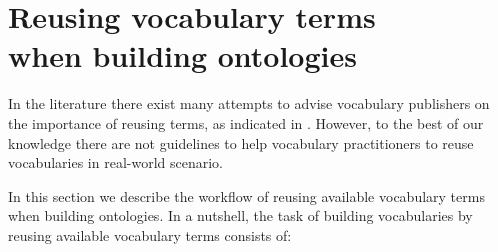

\section{Reusing vocabulary terms\\ when building ontologies}\label{sec:reuse}

In the literature there exist many attempts to advise vocabulary publishers on the importance of reusing terms, as indicated in \cite{janowicz2014five,jimenez2008}. However, to the best of our knowledge there are not guidelines to help vocabulary practitioners to reuse vocabularies in real-world scenario. 

In this section we describe the workflow of reusing available vocabulary terms when building ontologies. In a nutshell, the task of building vocabularies by reusing available vocabulary terms consists of:

